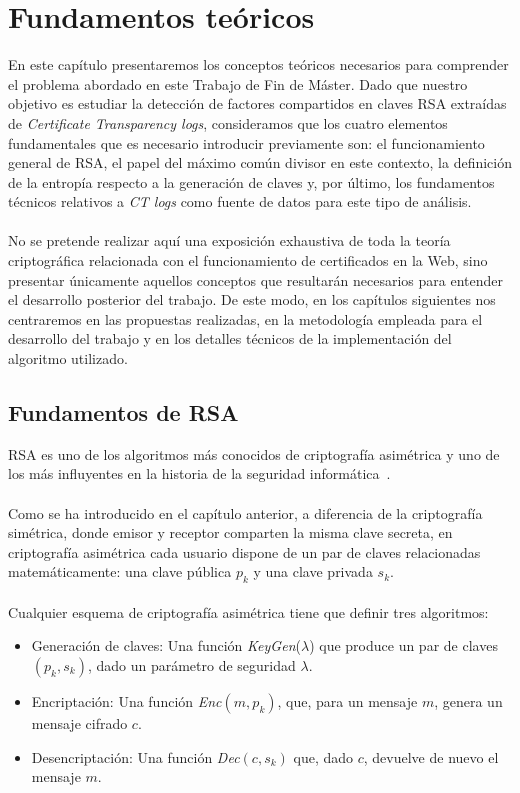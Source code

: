 \chapter{Fundamentos teóricos}
\label{chap-The}
En este capítulo presentaremos los conceptos teóricos necesarios para comprender el problema abordado en este Trabajo de Fin de Máster. Dado que nuestro objetivo es estudiar la detección de factores compartidos en claves RSA extraídas de \textit{Certificate Transparency logs}, consideramos que los cuatro elementos fundamentales que es necesario introducir previamente son: el funcionamiento general de RSA, el papel del máximo común divisor en este contexto, la definición de la entropía respecto a la generación de claves y, por último, los fundamentos técnicos relativos a \textit{CT logs} como fuente de datos para este tipo de análisis.
\\
\\
No se pretende realizar aquí una exposición exhaustiva de toda la teoría criptográfica relacionada con el funcionamiento de certificados en la Web, sino presentar únicamente aquellos conceptos que resultarán necesarios para entender el desarrollo posterior del trabajo. De este modo, en los capítulos siguientes nos centraremos en las propuestas realizadas, en la metodología empleada para el desarrollo del trabajo y en los detalles técnicos de la implementación del algoritmo utilizado.

\section{Fundamentos de RSA}

RSA es uno de los algoritmos más conocidos de criptografía asimétrica y uno de los más influyentes en la historia de la seguridad informática~\citep{rivest1978method}.
\\
\\
Como se ha introducido en el capítulo anterior, a diferencia de la criptografía simétrica, donde emisor y receptor comparten la misma clave secreta, en criptografía asimétrica cada usuario dispone de un par de claves relacionadas matemáticamente: una clave pública $p_k$ y una clave privada $s_k$.
\\
\\
Cualquier esquema de criptografía asimétrica tiene que definir tres algoritmos:

\begin{itemize}
\item Generación de claves: Una función \textit{KeyGen}($\lambda$) que produce un par de claves $(p_k,s_k)$, dado un parámetro de seguridad $\lambda$.
\item Encriptación: Una función \textit{Enc}$(m,p_k)$, que, para un mensaje $m$, genera un mensaje cifrado $c$.
\item Desencriptación: Una función \textit{Dec}$(c,s_k)$ que, dado $c$, devuelve de nuevo el mensaje $m$.
\end{itemize}

